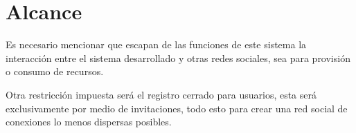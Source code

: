 \section{Alcance}
Es necesario mencionar que escapan de las funciones de este sistema la
interacción entre el sistema desarrollado y otras redes sociales, sea para
provisión o consumo de recursos.

Otra restricción impuesta será el registro cerrado para usuarios, esta será
exclusivamente por medio de invitaciones, todo esto para crear una red social
de conexiones lo menos dispersas posibles.

